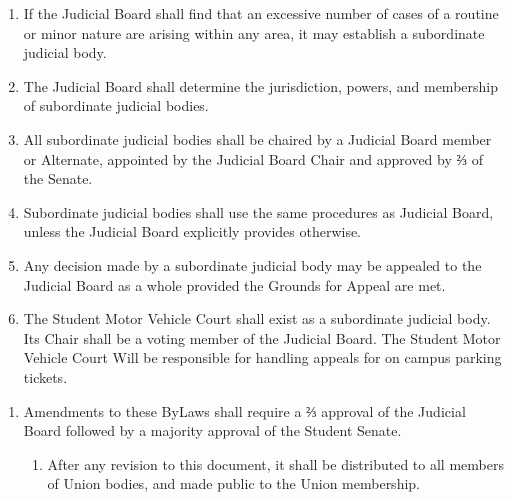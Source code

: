 \begin{enumerate}
\item If the Judicial Board shall find that an excessive number of cases of a routine or minor nature are arising within any area, it may establish a subordinate judicial body.
\item The Judicial Board shall determine the jurisdiction, powers, and membership of subordinate judicial bodies.
\item All subordinate judicial bodies shall be chaired by a Judicial Board member or Alternate, appointed by the Judicial Board Chair and approved by ⅔ of the Senate.
\item Subordinate judicial bodies shall use the same procedures as Judicial Board, unless the Judicial Board explicitly provides otherwise.
\item Any decision made by a subordinate judicial body may be appealed to the Judicial Board as a whole provided the Grounds for Appeal are met.
\item The Student Motor Vehicle Court shall exist as a subordinate judicial body. Its Chair shall be a voting member of the Judicial Board. The Student Motor Vehicle Court Will be responsible for handling appeals for on campus parking tickets.
\end{enumerate}


\begin{enumerate}
\item Amendments to these ByLaws shall require a ⅔ approval of the Judicial Board followed by a majority approval of the Student Senate.
  \begin{enumerate}
  \item After any revision to this document, it shall be distributed to all members of Union bodies, and made public to the Union membership.
  \end{enumerate}
\end{enumerate}
